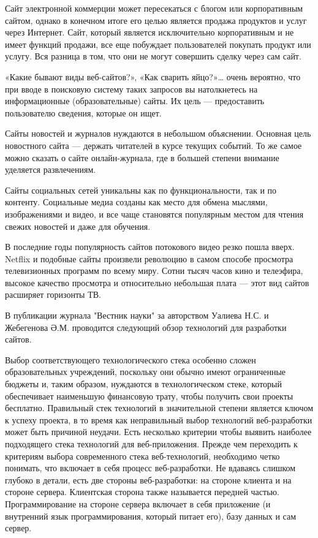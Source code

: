 Сайт электронной коммерции может пересекаться с блогом или корпоративным сайтом, однако в конечном итоге его целью является продажа продуктов и услуг через Интернет.
Сайт, который является исключительно корпоративным и не имеет функций продажи, все еще побуждает пользователей покупать продукт или услугу.
Вся разница в том, что они не могут совершить сделку через сам сайт.

«Какие бывают виды веб-сайтов?», «Как сварить яйцо?»… очень вероятно, что при вводе в поисковую систему таких запросов вы натолкнетесь на информационные (образовательные) сайты.
Их цель — предоставить пользователю сведения, которые он ищет.

Сайты новостей и журналов нуждаются в небольшом объяснении.
Основная цель новостного сайта — держать читателей в курсе текущих событий.
То же самое можно сказать о сайте онлайн-журнала, где в большей степени внимание уделяется развлечениям.

Сайты социальных сетей уникальны как по функциональности, так и по контенту.
Социальные медиа созданы как место для обмена мыслями, изображениями и видео, и все чаще становятся популярным местом для чтения свежих новостей и даже для обучения.

В последние годы популярность сайтов потокового видео резко пошла вверх.
Netflix и подобные сайты произвели революцию в самом способе просмотра телевизионных программ по всему миру.
Сотни тысяч часов кино и телеэфира, высокое качество просмотра и относительно небольшая плата — этот вид сайтов расширяет горизонты ТВ.

В публикации \cite{ualiev-jebegenov-issledovanie} журнала "Вестник науки" за авторством Уалиева Н.С. и Жебегенова Ә.М. проводится следующий обзор технологий для разработки сайтов.

Выбор соответствующего технологического стека особенно сложен образовательных учреждений, поскольку они обычно имеют ограниченные бюджеты и, таким образом, нуждаются в технологическом стеке, который обеспечивает наименьшую финансовую трату, чтобы получить свои проекты бесплатно.
Правильный стек технологий в значительной степени является ключом к успеху проекта, в то время как неправильный выбор технологий веб-разработки может быть причиной неудачи.
Есть несколько критерии чтобы выявить наиболее подходящего стека технологий для веб-приложения.
Прежде чем переходить к критериям выбора современного стека веб-технологий, необходимо четко понимать, что включает в себя процесс веб-разработки.
Не вдаваясь слишком глубоко в детали, есть две стороны веб-разработки: на стороне клиента и на стороне сервера.
Клиентская сторона также называется передней частью.
Программирование на стороне сервера включает в себя приложение (и внутренний язык программирования, который питает его), базу данных и сам сервер.


